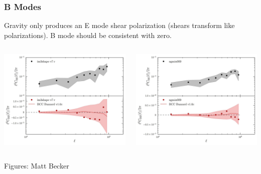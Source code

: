 \documentclass{beamer}
\begin{document}
\frame
{
    \frametitle{B Modes}

    Gravity only produces an E mode shear polarization (shears transform like
    polarizations).  B mode should be consistent with zero.

    \begin{columns}
        \begin{column}{0.5\textwidth}
            \begin{center}
                \includegraphics[width=\textwidth]{bmode-im3shape.png}
            \end{center}
        \end{column}
        \begin{column}{0.5\textwidth}
            \begin{center}
                \includegraphics[width=\textwidth]{bmode-ngmix.png}
            \end{center}
        \end{column}
    \end{columns}
    {\tiny Figures: Matt Becker}
}
\end{document}
